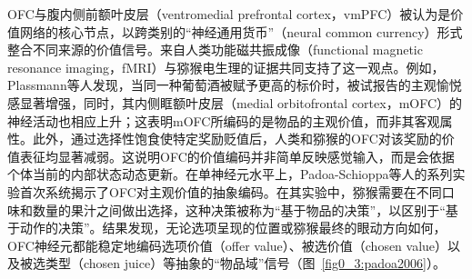 OFC与腹内侧前额叶皮层（ventromedial prefrontal cortex，vmPFC）被认为是价值网络的核心节点，以跨类别的“神经通用货币”（neural common currency）形式整合不同来源的价值信号\cite{levy2012root}。来自人类功能磁共振成像（functional magnetic resonance imaging，fMRI）与猕猴电生理的证据共同支持了这一观点。例如，Plassmann等人发现，当同一种葡萄酒被赋予更高的标价时，被试报告的主观愉悦感显著增强，同时，其内侧眶额叶皮层（medial orbitofrontal cortex，mOFC）的神经活动也相应上升\cite{plassmann2008marketing}；这表明mOFC所编码的是物品的主观价值，而非其客观属性。此外，通过选择性饱食使特定奖励贬值后，人类和猕猴的OFC对该奖励的价值表征均显著减弱\cite{gottfried2003encoding,pastorbernier2021satiety}。这说明OFC的价值编码并非简单反映感觉输入，而是会依据个体当前的内部状态动态更新。在单神经元水平上，Padoa-Schioppa等人的系列实验首次系统揭示了OFC对主观价值的抽象编码。在其实验中，猕猴需要在不同口味和数量的果汁之间做出选择，这种决策被称为“基于物品的决策”，以区别于“基于动作的决策”。结果发现，无论选项呈现的位置或猕猴最终的眼动方向如何，OFC神经元都能稳定地编码选项价值（offer value）、被选价值（chosen value）以及被选类型（chosen juice）等抽象的“物品域”信号（图~\ref{fig0_3:padoa2006}）\cite{padoaschioppa2006neurons, padoaschioppa2011neurobiology, padoaschioppa2017orbitofrontal}。

